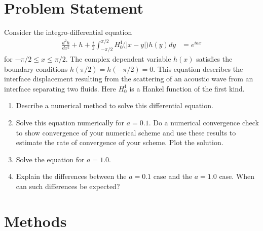 \documentclass[10pt]{article}
\begin{document}

\pagestyle{fancy}
\fancyhf{}
\setlength\headheight{12pt}

\section*{Problem Statement}
Consider the integro-differential equation
\begin{align}
    \frac{d^2h}{dx^2} + h + \frac{i}{2} \int_{-\pi/2}^{\pi/2} H^1_0 \big( |x - y| \big) h(y)dy &= e^{iax}
\end{align}
for $-\pi/2 \leq x \leq \pi/2$. 
The complex dependent variable $h(x)$ satisfies the boundary conditions $h(\pi/2) = h(-\pi/2) = 0$. 
This equation describes the interface displacement resulting from the scattering of an acoustic wave from an interface separating two fluids.
Here $H^1_0$ is a Hankel function of the first kind.
\begin{enumerate}
    \item Describe a numerical method to solve this differential equation.
    
    \item Solve this equation numerically for $a = 0.1$. 
    Do a numerical convergence check to show convergence of your numerical scheme and use these results to estimate the rate of convergence of your scheme.
    Plot the solution.

    \item Solve the equation for $a = 1.0$.

    \item Explain the differences between the $a = 0.1$ case and the $a = 1.0$ case.
    When can such differences be expected?

\end{enumerate}

\section*{Methods}
\end{document}
